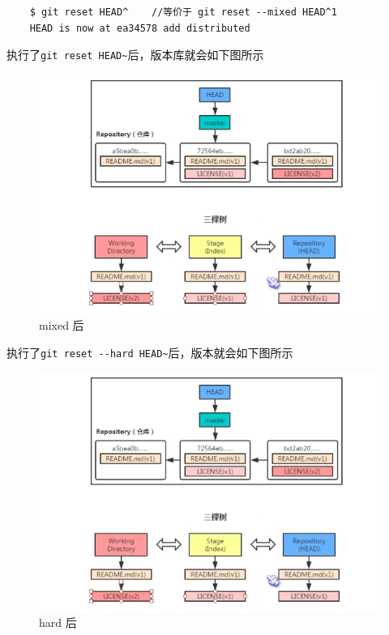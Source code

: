 \documentclass[UTF8,a4paper,12pt]{ctexbook}
\begin{document}
			\begin{lstlisting}
	$ git reset HEAD^    //等价于 git reset --mixed HEAD^1
	HEAD is now at ea34578 add distributed
			\end{lstlisting}
			
			执行了\verb|git reset HEAD~|后，版本库就会如下图所示
				\begin{figure}
					\centering
					\includegraphics[scale = 0.7]{figure/reset-mix.png}
					\caption{mixed 后}
				\end{figure}
			
			执行了\verb|git reset --hard HEAD~|后，版本就会如下图所示
				\begin{figure}
					\centering
					\includegraphics[scale = 0.7]{figure/reset-mix.png}
					\caption{hard 后}
				\end{figure}
		 
\end{document}
